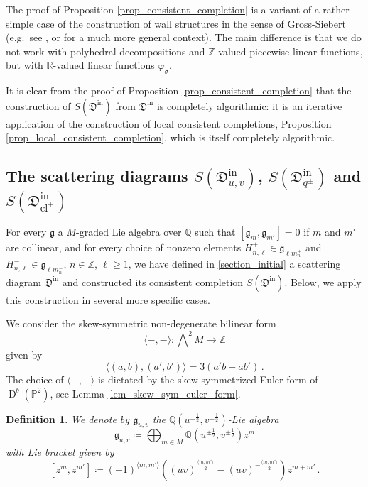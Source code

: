 \documentclass[12pt, a4paper]{amsart}
\newtheorem{defn}{Definition}[section]
\newcommand\PP{\mathbb P}
\newcommand\R{\mathbb R}
\newcommand\Q{\mathbb Q}
\newcommand\Z{\mathbb Z}
\newcommand\fD{\mathfrak D}
\newcommand\fg{\mathfrak g}
\newcommand\cl{\operatorname{cl}}
\newcommand\D{\operatorname{D}}
\newcommand\iin{\mathrm{in}}
\begin{document}
The proof of Proposition 
\ref{prop_consistent_completion}
is a variant of a rather simple case of the construction of 
wall structures in the sense of Gross-Siebert (e.g.\ see 
\cite[\S 6.3.3]{MR2722115}, or \cite{MR2846484} for a much more general context). The main difference is that we do not work with 
polyhedral decompositions and $\Z$-valued 
piecewise linear functions, but with $\R$-valued linear functions $\varphi_\sigma$.


It is clear from the proof of Proposition
\ref{prop_consistent_completion} that the construction of $S(\fD^\iin)$ from
$\fD^\iin$ is completely algorithmic:
it is an iterative application of the construction of local consistent completions,
Proposition
\ref{prop_local_consistent_completion}, which is itself completely algorithmic.


\subsection{The scattering diagrams $S(\fD^\iin_{u,v})$, $S(\fD^\iin_{q^\pm})$ and $S(\fD^\iin_{\cl^\pm})$} \label{section_scattering_final}


For every $\fg$
a $M$-graded Lie algebra over 
$\Q$ such that 
$[\fg_m,\fg_{m'}]=0$ if 
$m$ and $m'$ are collinear, 
and for every choice of nonzero elements 
$H_{n,\ell}^+ \in \fg_{\ell m_n^+}$
and $H_{n,\ell}^- \in \fg_{\ell m_n^-}$, $n\in\Z$,
$\ell \geqslant 1$, we have defined
in \cref{section_initial} a scattering diagram 
$\fD^\iin$ and constructed its consistent completion $S(\fD^\iin)$.
Below, we apply this construction in several more specific cases.

We consider the skew-symmetric non-degenerate bilinear form
\[\langle -,- \rangle \colon 
\bigwedge\nolimits^2 M \rightarrow \Z \]
given by 
\[ \langle (a,b), (a',b') \rangle = 
3 (a'b-ab') \,.\]
The choice of 
$\langle -,- \rangle$ is dictated by the skew-symmetrized Euler form of $\D^b(\PP^2)$,
see Lemma \ref{lem_skew_sym_euler_form}.



\begin{defn} \label{def_lie_algebra}
We denote by $\fg_{u,v}$ the $\Q(u^{\pm \frac{1}{2}}, v^{\pm \frac{1}{2}})$-Lie algebra 
\[\fg_{u,v}\coloneq \bigoplus_{m \in M} 
\Q(u^{\pm \frac{1}{2}}, v^{\pm \frac{1}{2}}) z^m\]
with Lie bracket given by
\[[z^m, z^{m'}] \coloneq
(-1)^{\langle m,m'\rangle} ((uv)^{\frac{\langle m,m' \rangle}{2}}
-(uv)^{-\frac{\langle m,m' \rangle}{2}})
 z^{m+m'}\,.\]
\end{defn}
\end{document}

